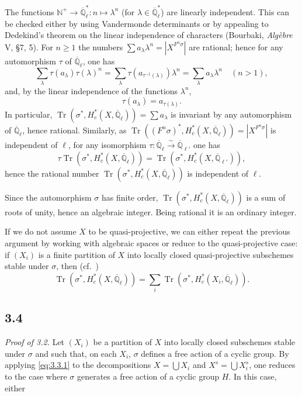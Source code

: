 \documentclass[11pt]{amsart}
\theoremstyle{plain}
\theoremstyle{remark}
\DeclareMathOperator{\Tr}{Tr}
\begin{document}
The functions $\mathbb{N}^+ \to \overline{\mathbb{Q}}_\ell^*: n \mapsto \lambda^n$ (for $\lambda \in \overline{\mathbb{Q}}_\ell^*$) are linearly independent. This can be checked either by using Vandermonde determinants or by appealing to Dedekind's theorem on the linear independence of characters (Bourbaki, \textit{Alg\`ebre} V, \S 7, 5). For $n \ge 1$ the numbers $\sum a_\lambda \lambda^n = |X^{F^n\sigma}|$ are rational; hence for any automorphism $\tau$ of $\overline{\mathbb{Q}}_\ell$, one has
\[
\sum_\lambda \tau(a_\lambda)\tau(\lambda)^n = \sum_\lambda \tau(a_{\tau^{-1}(\lambda)})\lambda^n = \sum_\lambda a_\lambda \lambda^n \quad (n > 1),
\]
and, by the linear independence of the functions $\lambda^n$,
\[
\tau(a_\lambda) = a_{\tau(\lambda)}.
\]
In particular, $\Tr(\sigma^*, H_c^*(X, \overline{\mathbb{Q}}_\ell)) = \sum a_\lambda$ is invariant by any automorphism of $\overline{\mathbb{Q}}_\ell$, hence rational. Similarly, as $\Tr((F^n\sigma)^*, H_c^*(X, \overline{\mathbb{Q}}_\ell)) = |X^{F^n\sigma}|$ is independent of $\ell$, for any isomorphism $\tau: \overline{\mathbb{Q}}_\ell \xrightarrow{\sim} \overline{\mathbb{Q}}_{\ell'}$ one has
\[
\tau \Tr(\sigma^*, H_c^*(X, \overline{\mathbb{Q}}_\ell)) = \Tr(\sigma^*, H_c^*(X, \overline{\mathbb{Q}}_{\ell'})),
\]
hence the rational number $\Tr(\sigma^*, H_c^*(X, \overline{\mathbb{Q}}_\ell))$ is independent of $\ell$.

Since the automorphism $\sigma$ has finite order, $\Tr(\sigma^*, H_c^*(X, \overline{\mathbb{Q}}_\ell))$ is a sum of roots of unity, hence an algebraic integer. Being rational it is an ordinary integer.

If we do not assume $X$ to be quasi-projective, we can either repeat the previous argument by working with algebraic spaces or reduce to the quasi-projective case: if $(X_i)$ is a finite partition of $X$ into locally closed quasi-projective subschemes stable under $\sigma$, then (cf.\ \cite{SGA4.5})
\begin{equation}\label{eq:3.3.1}
\Tr(\sigma^*, H_c^*(X, \overline{\mathbb{Q}}_\ell)) = \sum_i \Tr(\sigma^*, H_c^*(X_i, \overline{\mathbb{Q}}_\ell)).
\end{equation}

\subsection{3.4} \textit{Proof of 3.2.} Let $(X_i)$ be a partition of $X$ into locally closed subschemes stable under $\sigma$ and such that, on each $X_i$, $\sigma$ defines a free action of a cyclic group. By applying \eqref{eq:3.3.1} to the decompositions $X = \bigcup X_i$ and $X^s = \bigcup X_i^s$, one reduces to the case where $\sigma$ generates a free action of a cyclic group $H$. In this case, either
\end{document}
